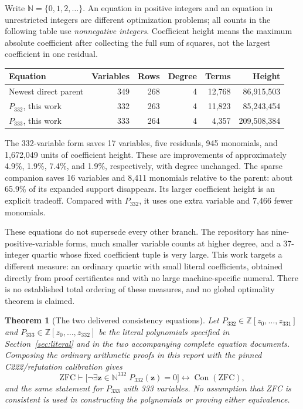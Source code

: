 \documentclass[11pt,letterpaper]{article}
\newtheorem{theorem}{Theorem}[section]
\theoremstyle{remark}\newtheorem{remark}[theorem]{Remark}
\newcommand{\N}{\mathbb N}\newcommand{\Z}{\mathbb Z}
\newcommand{\Con}{\operatorname{Con}}\newcommand{\ZFC}{\mathrm{ZFC}}
\newcommand{\Psmall}{P_{332}}\newcommand{\Psparse}{P_{333}}
\begin{document}
Write \(\N=\{0,1,2,\ldots\}\). An equation in positive integers and an
equation in unrestricted integers are different optimization problems;
all counts in the following table use \emph{nonnegative integers}.
Coefficient height means the maximum absolute coefficient after collecting
the full sum of squares, not the largest coefficient in one residual.

\begin{center}
\begin{tabular}{@{}lrrrrr@{}}\toprule
Equation & Variables & Rows & Degree & Terms & Height\\\midrule
Newest direct parent &349&268&4&12,768&86,915,503\\
\(\Psmall\), this work &332&263&4&11,823&85,243,454\\
\(\Psparse\), this work &333&264&4&4,357&209,508,384\\\bottomrule
\end{tabular}
\end{center}

The 332-variable form saves 17 variables, five residuals, 945 monomials,
and 1,672,049 units of coefficient height. These are improvements of
approximately 4.9\%, 1.9\%, 7.4\%, and 1.9\%, respectively, with degree
unchanged. The sparse companion saves 16 variables and 8,411 monomials
relative to the parent: about 65.9\% of its expanded support disappears.
Its larger coefficient height is an explicit tradeoff. Compared with
\(\Psmall\), it uses one extra variable and 7,466 fewer monomials.

These equations do not supersede every other branch. The repository has
nine-positive-variable forms, much smaller variable counts at higher
degree, and a 37-integer quartic whose fixed coefficient tuple is very
large. This work targets a different measure: an ordinary quartic with
small literal coefficients, obtained directly from proof certificates and
with no large machine-specific numeral. There is no established total
ordering of these measures, and no global optimality theorem is claimed.

\begin{theorem}[The two delivered consistency equations]
\label{thm:main}
Let \(\Psmall\in\Z[z_0,\ldots,z_{331}]\) and
\(\Psparse\in\Z[z_0,\ldots,z_{332}]\) be the literal polynomials
specified in Section~\ref{sec:literal} and in the two accompanying complete
equation documents. Composing the ordinary arithmetic proofs in this
report with the pinned C222/refutation calibration gives
\[
 \ZFC\vdash
 \bigl[\neg\exists\boldsymbol z\in\N^{332}\;
                  \Psmall(\boldsymbol z)=0\bigr]
       \longleftrightarrow\Con(\ZFC),
\]
and the same statement for \(\Psparse\) with 333 variables.
No assumption that ZFC is consistent is used in constructing the
polynomials or proving either equivalence.
\end{theorem}
\end{document}
